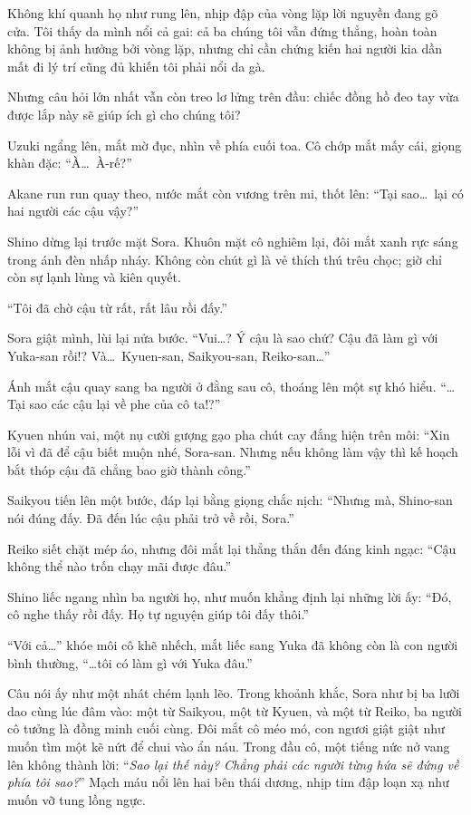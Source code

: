 \documentclass[../main.tex]{subfiles}
\begin{document}

Không khí quanh họ như rung lên, nhịp đập của vòng lặp lời nguyền đang gõ cửa. Tôi thấy da mình nổi cả gai: cả ba chúng tôi vẫn đứng thẳng, hoàn toàn không bị ảnh hưởng bởi vòng lặp, nhưng chỉ cần chứng kiến hai người kia dần mất đi lý trí cũng đủ khiến tôi phải nổi da gà.

Nhưng câu hỏi lớn nhất vẫn còn treo lơ lửng trên đầu: chiếc đồng hồ đeo tay vừa được lắp này sẽ giúp ích gì cho chúng tôi?

\pov{-}

Uzuki ngẩng lên, mắt mờ đục, nhìn về phía cuối toa. Cô chớp mắt mấy cái, giọng khàn đặc: ``À\dots\ À-rế?''

Akane run run quay theo, nước mắt còn vương trên mi, thốt lên: ``Tại sao\dots\ lại có hai người các cậu vậy?''

Shino dừng lại trước mặt Sora. Khuôn mặt cô nghiêm lại, đôi mắt xanh rực sáng trong ánh đèn nhấp nháy. Không còn chút gì là vẻ thích thú trêu chọc; giờ chỉ còn sự lạnh lùng và kiên quyết.

``Tôi đã chờ cậu từ rất, rất lâu rồi đấy.''

Sora giật mình, lùi lại nửa bước. ``Vui\dots? Ý cậu là sao chứ? Cậu đã làm gì với Yuka-san rồi!? Và\dots\ Kyuen-san, Saikyou-san, Reiko-san\dots''

Ánh mắt cậu quay sang ba người ở đằng sau cô, thoáng lên một sự khó hiểu. ``\dots Tại sao các cậu lại về phe của cô ta!?''

Kyuen nhún vai, một nụ cười gượng gạo pha chút cay đắng hiện trên môi: ``Xin lỗi vì đã để cậu biết muộn nhé, Sora-san. Nhưng nếu không làm vậy thì kế hoạch bắt thóp cậu đã chẳng bao giờ thành công.''

Saikyou tiến lên một bước, đáp lại bằng giọng chắc nịch: ``Nhưng mà, Shino-san nói đúng đấy. Đã đến lúc cậu phải trở về rồi, Sora.''

Reiko siết chặt mép áo, nhưng đôi mắt lại thẳng thắn đến đáng kinh ngạc: ``Cậu không thể nào trốn chạy mãi được đâu.''

Shino liếc ngang nhìn ba người họ, như muốn khẳng định lại những lời ấy: ``Đó,  cô nghe thấy rồi đấy. Họ tự nguyện giúp tôi đấy thôi.''

``Với cả\dots'' khóe môi cô khẽ nhếch, mắt liếc sang Yuka đã không còn là con người bình thường, ``\dots tôi có làm gì với Yuka đâu.''

Câu nói ấy như một nhát chém lạnh lẽo. Trong khoảnh khắc, Sora như bị ba lưỡi dao cùng lúc đâm vào: một từ Saikyou, một từ Kyuen, và một từ Reiko, ba người cô tưởng là đồng minh cuối cùng. Đôi mắt cô méo mó, con ngươi giật giật như muốn tìm một kẽ nứt để chui vào ẩn náu. Trong đầu cô, một tiếng nức nở vang lên không thành lời: ``\textit{Sao lại thế này? Chẳng phải các người từng hứa sẽ đứng về phía tôi sao?}'' Mạch máu nổi lên hai bên thái dương, nhịp tim đập loạn xạ như muốn vỡ tung lồng ngực.
\end{document}

